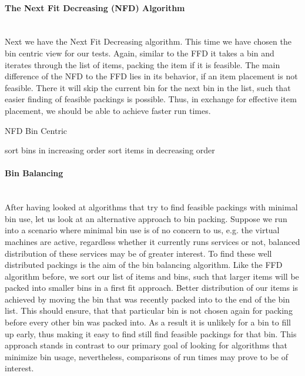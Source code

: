 \documentclass[a4paper,11pt,titlepage]{article}
\begin{document}
\paragraph{The Next Fit Decreasing (NFD) Algorithm}
\mbox{} \\

Next we have the Next Fit Decreasing algorithm. This time we have chosen the bin centric view for our tests. Again, similar to the FFD it takes a bin and iterates through the list of items, packing the item if it is feasible. The main difference of the NFD to the FFD lies in its behavior, if an item placement is not feasible. There it will skip the current bin for the next bin in the list, such that easier finding of feasible packings is possible.
Thus, in exchange for effective item placement, we should be able to achieve faster run times. 


\begin{algorithm}
	
	\caption{NFD Bin Centric}\label{alg:two}
	sort bins in increasing order\;
	sort items in decreasing order\;
	
		
\end{algorithm}

\paragraph{Bin Balancing}
\mbox{} \\

After having looked at algorithms that try to find feasible packings with minimal bin use, let us look at an alternative approach to bin packing. Suppose we run into a scenario where minimal bin use is of no concern to us, e.g. the virtual machines are active, regardless whether it currently runs services or not, balanced distribution of these services may be of greater interest. To find these well distributed packings is the aim of the bin balancing algorithm.
Like the FFD algorithm before, we sort our list of items and bins, such that larger items will be packed into smaller bins in a first fit approach. Better distribution of our items is achieved by moving the bin that was recently packed into to the end of the bin list. This should ensure, that that particular bin is not chosen again for packing before every other bin was packed into. As a result it is unlikely for a bin to fill up early, thus making it easy to find still find feasible packings for that bin. 
This approach stands in contrast to our primary goal of looking for algorithms that minimize bin usage, nevertheless, comparisons of run times may prove to be of interest.
\end{document}
